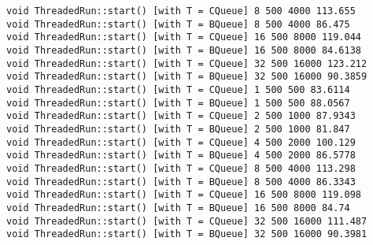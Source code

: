 \begin{verbatim}
void ThreadedRun::start() [with T = CQueue] 8 500 4000 113.655
void ThreadedRun::start() [with T = BQueue] 8 500 4000 86.475
void ThreadedRun::start() [with T = CQueue] 16 500 8000 119.044
void ThreadedRun::start() [with T = BQueue] 16 500 8000 84.6138
void ThreadedRun::start() [with T = CQueue] 32 500 16000 123.212
void ThreadedRun::start() [with T = BQueue] 32 500 16000 90.3859
void ThreadedRun::start() [with T = CQueue] 1 500 500 83.6114
void ThreadedRun::start() [with T = BQueue] 1 500 500 88.0567
void ThreadedRun::start() [with T = CQueue] 2 500 1000 87.9343
void ThreadedRun::start() [with T = BQueue] 2 500 1000 81.847
void ThreadedRun::start() [with T = CQueue] 4 500 2000 100.129
void ThreadedRun::start() [with T = BQueue] 4 500 2000 86.5778
void ThreadedRun::start() [with T = CQueue] 8 500 4000 113.298
void ThreadedRun::start() [with T = BQueue] 8 500 4000 86.3343
void ThreadedRun::start() [with T = CQueue] 16 500 8000 119.098
void ThreadedRun::start() [with T = BQueue] 16 500 8000 84.74
void ThreadedRun::start() [with T = CQueue] 32 500 16000 111.487
void ThreadedRun::start() [with T = BQueue] 32 500 16000 90.3981
\end{verbatim}


